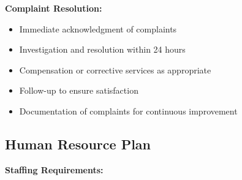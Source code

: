 \textbf{Complaint Resolution:}
\begin{itemize}[leftmargin=2em]
    \item Immediate acknowledgment of complaints
    \item Investigation and resolution within 24 hours
    \item Compensation or corrective services as appropriate
    \item Follow-up to ensure satisfaction
    \item Documentation of complaints for continuous improvement
\end{itemize}

\subsection{Human Resource Plan}

\textbf{Staffing Requirements:}

